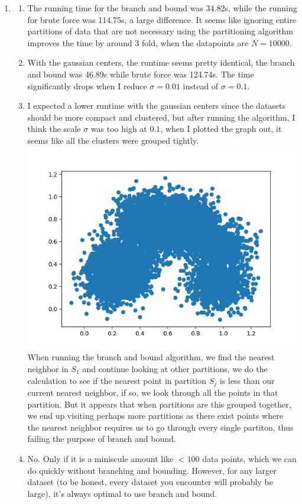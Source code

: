 \documentclass{article}
\begin{document}
\begin{enumerate}
        \item \begin{enumerate}[label=(\alph*)]
            \item The running time for the branch and bound was 34.82s, while the running for brute force was 114.75s, a large difference. It seems like ignoring entire partitions of data that are not necessary using the partitioning algorithm improves the time by around 3 fold, when the datapoints are $N = 10000$.
            \item With the gaussian centers, the runtime seems pretty identical, the branch and bound was 46.89s while brute force was 124.74s. The time significantly drops when I reduce $\sigma = 0.01$ instead of $\sigma=0.1$.
            \item I expected a lower runtime with the gaussian centers since the datasets should be more compact and clustered, but after running the algorithm, I think the scale $\sigma$ was too high at $0.1$, when I plotted the graph out, it seems like all the clusters were grouped tightly.\\\includegraphics[scale=0.25]{images/p6_16_b.png}\\When running the branch and bound algorithm, we find the nearest neighbor in $S_1$ and continue looking at other partitions, we do the calculation to see if the nearest point in partition $S_j$ is less than our current nearest neighbor, if so, we look through all the points in that partition. But it appears that when partitions are this grouped together, we end up visiting perhaps more partitions as there exist points where the nearest neighbor requires us to go through every single partiton, thus failing the purpose of branch and bound.
            \item No. Only if it is a miniscule amount like $<100$ data points, which we can do quickly without branching and bounding. However, for any larger dataset (to be honest, every dataset you encounter will probably be large), it's always optimal to use branch and bound.
        \end{enumerate}
    \end{enumerate}
\end{document}

